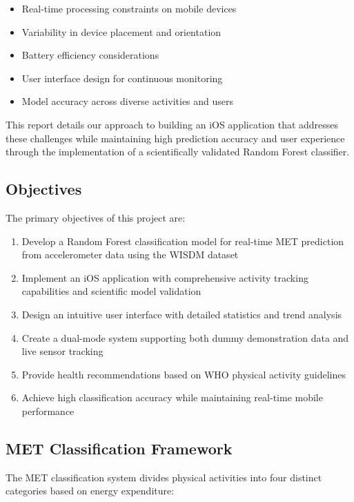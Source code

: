 \documentclass[11pt,a4paper]{article}
\begin{document}
\begin{itemize}
    \item Real-time processing constraints on mobile devices
    \item Variability in device placement and orientation
    \item Battery efficiency considerations
    \item User interface design for continuous monitoring
    \item Model accuracy across diverse activities and users
\end{itemize}

This report details our approach to building an iOS application that addresses these challenges while maintaining high prediction accuracy and user experience through the implementation of a scientifically validated Random Forest classifier.

\subsection{Objectives}

The primary objectives of this project are:

\begin{enumerate}
    \item Develop a Random Forest classification model for real-time MET prediction from accelerometer data using the WISDM dataset
    \item Implement an iOS application with comprehensive activity tracking capabilities and scientific model validation
    \item Design an intuitive user interface with detailed statistics and trend analysis
    \item Create a dual-mode system supporting both dummy demonstration data and live sensor tracking
    \item Provide health recommendations based on WHO physical activity guidelines
    \item Achieve high classification accuracy while maintaining real-time mobile performance
\end{enumerate}

\subsection{MET Classification Framework}

The MET classification system divides physical activities into four distinct categories based on energy expenditure:
\end{document}
